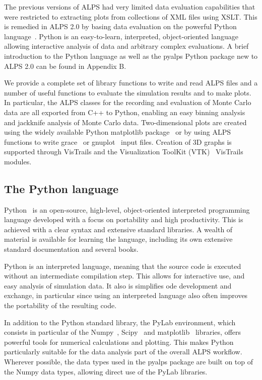 \documentclass[12pt]{iopart}
\begin{document}
\medskip

The previous versions of ALPS had very limited data evaluation capabilities that were restricted to extracting plots from collections of XML files using XSLT. This is remedied in ALPS 2.0 by basing data evaluation on the powerful Python language~\cite{python}. Python is an easy-to-learn, interpreted, object-oriented language allowing interactive analysis of data and arbitrary complex evaluations. A brief introduction to the Python language as well as the pyalps Python package new to ALPS 2.0 can be found in Appendix B.

We provide a complete set of library functions to write and read ALPS files and a number of useful functions to evaluate the simulation results and to make plots. In particular, the ALPS classes for the recording and evaluation of Monte Carlo data are all exported from C++ to Python, enabling an easy binning analysis~\cite{Ambegaokar2010} and jackknife analysis of Monte Carlo data.
Two-dimensional plots are created using the widely available Python matplotlib package~\cite{matplotlib} or by using ALPS functions to write grace~\cite{grace} or gnuplot~\cite{gnuplot} input files. Creation of 3D graphs is supported through VisTrails and the Visualization ToolKit (VTK)~\cite{vtk} VisTrails modules.

\subsection{The Python language}

Python~\cite{python} is an open-source, high-level, object-oriented interpreted programming language developed with a focus on portability and high productivity. This is achieved with a clear syntax and extensive standard libraries. A wealth of material is available for learning the language, including its own extensive standard documentation and several books\cite{LearningPython, ProgrammingPython}.

Python is an interpreted language, meaning that the source code is executed without an intermediate compilation step. This allows for interactive use, and easy analysis of simulation data. It also is simplifies ode development and exchange, in particular since using an interpreted language also often improves the portability of the resulting code.

In addition to the Python standard library, the PyLab environment, which consists in particular of the Numpy~\cite{numpy}, Scipy~\cite{scipy} and matplotlib~\cite{matplotlib} libraries, offers powerful tools for numerical calculations and plotting. This makes Python particularly suitable for the data analysis part of the overall ALPS workflow. Wherever possible, the data types used in the pyalps package are built on top of the Numpy data types, allowing direct use of the PyLab libraries.
\end{document}
